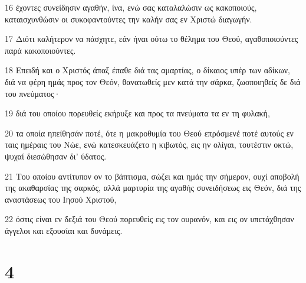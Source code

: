 \par 16 έχοντες συνείδησιν αγαθήν, ίνα, ενώ σας καταλαλώσιν ως κακοποιούς, καταισχυνθώσιν οι συκοφαντούντες την καλήν σας εν Χριστώ διαγωγήν.
\par 17 Διότι καλήτερον να πάσχητε, εάν ήναι ούτω το θέλημα του Θεού, αγαθοποιούντες παρά κακοποιούντες.
\par 18 Επειδή και ο Χριστός άπαξ έπαθε διά τας αμαρτίας, ο δίκαιος υπέρ των αδίκων, διά να φέρη ημάς προς τον Θεόν, θανατωθείς μεν κατά την σάρκα, ζωοποιηθείς δε διά του πνεύματος·
\par 19 διά του οποίου πορευθείς εκήρυξε και προς τα πνεύματα τα εν τη φυλακή,
\par 20 τα οποία ηπείθησάν ποτέ, ότε η μακροθυμία του Θεού επρόσμενέ ποτέ αυτούς εν ταις ημέραις του Νώε, ενώ κατεσκευάζετο η κιβωτός, εις ην ολίγαι, τουτέστιν οκτώ, ψυχαί διεσώθησαν δι' ύδατος.
\par 21 Του οποίου αντίτυπον ον το βάπτισμα, σώζει και ημάς την σήμερον, ουχί αποβολή της ακαθαρσίας της σαρκός, αλλά μαρτυρία της αγαθής συνειδήσεως εις Θεόν, διά της αναστάσεως του Ιησού Χριστού,
\par 22 όστις είναι εν δεξιά του Θεού πορευθείς εις τον ουρανόν, και εις ον υπετάχθησαν άγγελοι και εξουσίαι και δυνάμεις.

\chapter{4}

